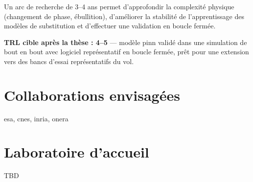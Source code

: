 \documentclass[12pt]{article}
\begin{document}
	Un arc de recherche de 3–4 ans permet d’approfondir la complexité physique (changement de phase, ébullition), d’améliorer la stabilité de l’apprentissage des modèles de substitution et d’effectuer une validation en boucle fermée.
	
	\textbf{TRL cible après la thèse : 4–5} — modèle \acrshort{pinn} validé dans une simulation de bout en bout avec logiciel représentatif en boucle fermée, prêt pour une extension vers des bancs d’essai représentatifs du vol.
	
	
	\nocite{*}
	
	\printbibliography[title=Bibliographie indicative]
	
	\section*{Collaborations envisagées}
	
	\acrshort{esa}, \acrshort{cnes}, \acrshort{inria}, \acrshort{onera}
	
	\section*{Laboratoire d'accueil}
	
	TBD
	
	\printglossaries
	
\end{document}
